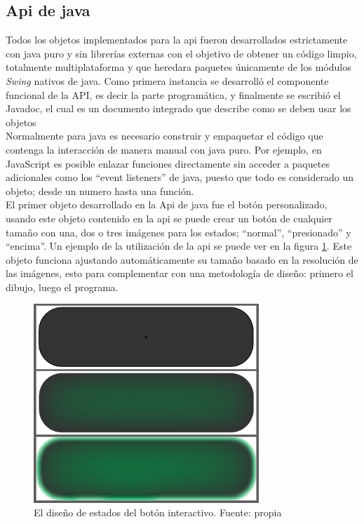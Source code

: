 \subsection{Api de java}
Todos los objetos implementados para la api fueron desarrollados estrictamente con java puro y sin librerías externas con el objetivo de obtener un código limpio, totalmente multiplataforma y que heredara paquetes únicamente de los módulos \textit{Swing} nativos de java. Como primera instancia se desarrolló el componente funcional de la API, es decir la parte programática, y finalmente se escribió el Javadoc, el cual es un documento integrado que describe como se deben usar los objetos 
\vspace{0.5cm}\\
Normalmente para java es necesario construir y empaquetar el código que contenga la interacción de manera manual con java puro. Por ejemplo, en JavaScript es posible enlazar funciones directamente sin acceder a paquetes adicionales como los ``event listeners'' de java, puesto que todo es considerado un objeto; desde un numero hasta una función.	
\vspace{0.5cm}\\
El primer objeto desarrollado en la Api de java fue el botón personalizado, usando este objeto contenido en la api se puede crear un botón de cualquier tamaño con una, dos o tres imágenes para los estados; ``normal'', ``presionado'' y ``encima''. Un ejemplo de la utilización de la api se puede ver en la figura \ref{fig_2}. Este objeto funciona ajustando automáticamente su tamaño basado en la resolución de las imágenes, esto para complementar con una metodología de diseño: primero el dibujo, luego el programa.

\begin{figure}[htbp]
	\centerline{\includegraphics[width=8.5cm]{./figuras/boton.png}}
	\caption{El diseño de estados del botón interactivo. Fuente: propia}
	\label{fig_2}
\end{figure}

